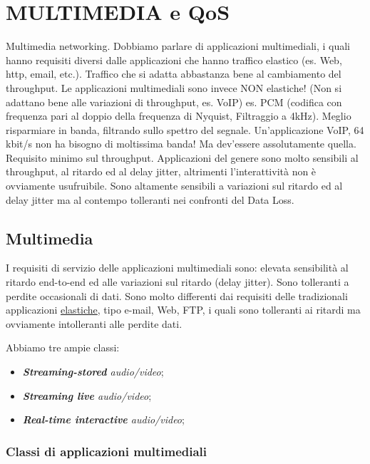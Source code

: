 \section{MULTIMEDIA e QoS}

Multimedia networking. Dobbiamo parlare di applicazioni multimediali, i quali hanno requisiti diversi dalle applicazioni che hanno traffico elastico (es. Web, http, email, etc.). Traffico che si adatta abbastanza bene al cambiamento del throughput. Le applicazioni multimediali sono invece NON elastiche! (Non si adattano bene alle variazioni di throughput, es. VoIP) es. PCM (codifica con frequenza pari al doppio della frequenza di Nyquist, Filtraggio a 4kHz). Meglio risparmiare in banda, filtrando sullo spettro del segnale. Un'applicazione VoIP, 64 kbit/s non ha bisogno di moltissima banda! Ma dev'essere assolutamente quella. Requisito minimo sul throughput. Applicazioni del genere sono molto sensibili al throughput, al ritardo ed al delay jitter, altrimenti l'interattività non è ovviamente usufruibile. Sono altamente sensibili a variazioni sul ritardo ed al delay jitter ma al contempo tolleranti nei confronti del Data Loss.

\subsection{Multimedia}

I requisiti di servizio delle applicazioni multimediali sono: elevata sensibilità al ritardo end-to-end ed alle variazioni sul ritardo (delay jitter). Sono tolleranti a perdite occasionali di dati. Sono molto differenti dai requisiti delle tradizionali applicazioni \underline{elastiche}, tipo e-mail, Web, FTP, i quali sono tolleranti ai ritardi ma ovviamente intolleranti alle perdite dati.

Abbiamo tre ampie classi:

\begin{itemize}

\item{\textit{\textbf{Streaming-stored} audio/video}};
\item{\textit{\textbf{Streaming live} audio/video}};
\item{\textit{\textbf{Real-time interactive} audio/video}};

\end{itemize}


\subsubsection{Classi di applicazioni multimediali}

